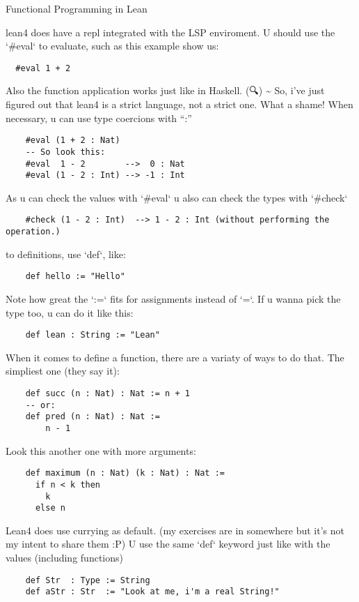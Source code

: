 \documentclass[11pt]{scrlttr2}
\date{\today}
\begin{document}
\begin{letter}{%
\mbox{}}

\opening{Functional Programming in Lean}

lean4 does have a repl integrated with the LSP enviroment.
U should use the `\#eval` to evaluate, such as this example show us:
\begin{verbatim}
  #eval 1 + 2
\end{verbatim}

Also the function application works just like in Haskell.
(🔍) \textasciitilde{} So, i've just figured out that lean4 is a strict language, not a strict one. What a shame!
When necessary, u can use type coercions with ``:''
\begin{verbatim}
    #eval (1 + 2 : Nat)
    -- So look this:
    #eval  1 - 2        -->  0 : Nat
    #eval (1 - 2 : Int) --> -1 : Int
\end{verbatim}

As u can check the values with  `\#eval`
u also can check the types with `\#check`
\begin{verbatim}
    #check (1 - 2 : Int)  --> 1 - 2 : Int (without performing the operation.)
\end{verbatim}
to definitions, use `def`, like:
\begin{verbatim}
    def hello := "Hello"
\end{verbatim}

Note how great the `:=` fits for assignments instead of `=`.
If u wanna pick the type too, u can do it like this:
\begin{verbatim}
    def lean : String := "Lean"
\end{verbatim}

When it comes to define a function, there are a variaty of ways to do that.
The simpliest one (they say it):
\begin{verbatim}
    def succ (n : Nat) : Nat := n + 1
    -- or:
    def pred (n : Nat) : Nat :=
        n - 1
\end{verbatim}


Look this another one with more arguments:
\begin{verbatim}
    def maximum (n : Nat) (k : Nat) : Nat :=
      if n < k then
        k
      else n
\end{verbatim}

Lean4 does use currying as default.
(my exercises are in somewhere but it's not my intent to share them :P)
U use the same `def` keyword just like with the values (including functions)
\begin{verbatim}
    def Str  : Type := String
    def aStr : Str  := "Look at me, i'm a real String!"
\end{verbatim}


\end{letter}
\end{document}
